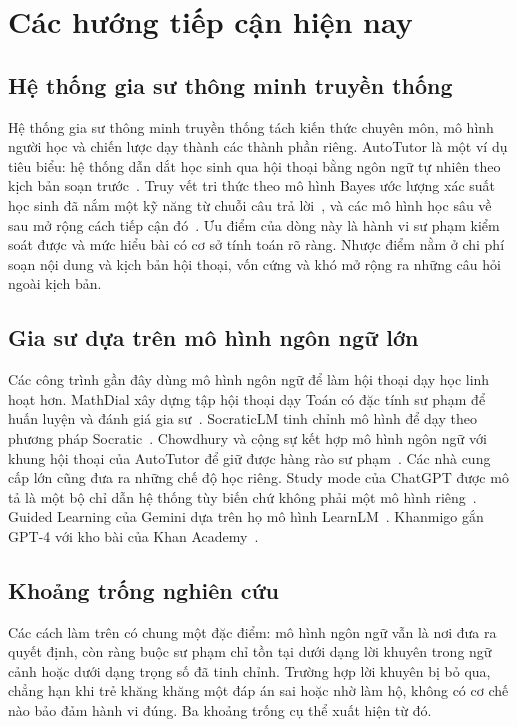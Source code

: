 \section{Các hướng tiếp cận hiện nay}

\subsection{Hệ thống gia sư thông minh truyền thống}
Hệ thống gia sư thông minh truyền thống tách kiến thức chuyên môn, mô hình người học và chiến lược dạy thành các thành phần riêng. AutoTutor là một ví dụ tiêu biểu: hệ thống dẫn dắt học sinh qua hội thoại bằng ngôn ngữ tự nhiên theo kịch bản soạn trước~\cite{graesser2005}. Truy vết tri thức theo mô hình Bayes ước lượng xác suất học sinh đã nắm một kỹ năng từ chuỗi câu trả lời~\cite{corbett1995}, và các mô hình học sâu về sau mở rộng cách tiếp cận đó~\cite{piech2015}. Ưu điểm của dòng này là hành vi sư phạm kiểm soát được và mức hiểu bài có cơ sở tính toán rõ ràng. Nhược điểm nằm ở chi phí soạn nội dung và kịch bản hội thoại, vốn cứng và khó mở rộng ra những câu hỏi ngoài kịch bản.

\subsection{Gia sư dựa trên mô hình ngôn ngữ lớn}
Các công trình gần đây dùng mô hình ngôn ngữ để làm hội thoại dạy học linh hoạt hơn. MathDial xây dựng tập hội thoại dạy Toán có đặc tính sư phạm để huấn luyện và đánh giá gia sư~\cite{macina2023}. SocraticLM tinh chỉnh mô hình để dạy theo phương pháp Socratic~\cite{liu2024socratic}. Chowdhury và cộng sự kết hợp mô hình ngôn ngữ với khung hội thoại của AutoTutor để giữ được hàng rào sư phạm~\cite{chowdhury2024}. Các nhà cung cấp lớn cũng đưa ra những chế độ học riêng. Study mode của ChatGPT được mô tả là một bộ chỉ dẫn hệ thống tùy biến chứ không phải một mô hình riêng~\cite{studymode}. Guided Learning của Gemini dựa trên họ mô hình LearnLM~\cite{guidedlearning,jurenka2024}. Khanmigo gắn GPT-4 với kho bài của Khan Academy~\cite{khanmigo}.

\subsection{Khoảng trống nghiên cứu}
Các cách làm trên có chung một đặc điểm: mô hình ngôn ngữ vẫn là nơi đưa ra quyết định, còn ràng buộc sư phạm chỉ tồn tại dưới dạng lời khuyên trong ngữ cảnh hoặc dưới dạng trọng số đã tinh chỉnh. Trường hợp lời khuyên bị bỏ qua, chẳng hạn khi trẻ khăng khăng một đáp án sai hoặc nhờ làm hộ, không có cơ chế nào bảo đảm hành vi đúng. Ba khoảng trống cụ thể xuất hiện từ đó.

